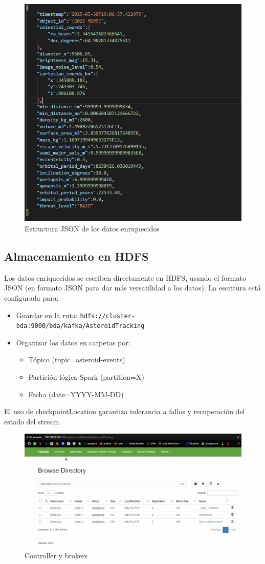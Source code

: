 \documentclass[12pt]{article}
\begin{document}
\begin{figure}[h!]
    \centering
    \includegraphics[width=.7\textwidth]{assets/proyecto/json.PNG}
    \caption{Estructura JSON de los datos enriquecidos}
    \label{fig:my_label}
\end{figure}

\clearpage

\subsection{Almacenamiento en HDFS}

Los datos enriquecidos se escriben directamente en HDFS, usando el formato JSON (en formato JSON para dar más versatilidad a
los datos). La escritura está configurada para:

\begin{itemize}
  \item Guardar en la ruta: \texttt{hdfs://cluster-bda:9000/bda/kafka/AsteroidTracking}
  \item Organizar los datos en carpetas por:
  \begin{itemize}
    \item Tópico (topic=asteroid-events)
    \item Partición lógica Spark (partition=X)
    \item Fecha (date=YYYY-MM-DD)
  \end{itemize}
\end{itemize}

El uso de checkpointLocation garantiza tolerancia a fallos y recuperación del estado del stream.

\begin{figure}[h!]
    \centering
    \includegraphics[width=.7\textwidth]{assets/proyecto/hdfs.PNG}
    \caption{Controller y brokers}
    \label{fig:my_label}
\end{figure}
\end{document}
